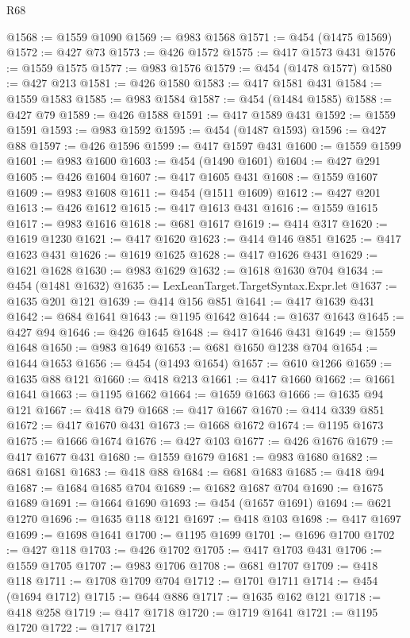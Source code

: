 \begin{lexlean}{R68}
\begin{coremodule}
@1568 := @1559 @1090
@1569 := @983 @1568
@1571 := @454 (@1475 @1569)
@1572 := @427 @73
@1573 := @426 @1572
@1575 := @417 @1573 @431
@1576 := @1559 @1575
@1577 := @983 @1576
@1579 := @454 (@1478 @1577)
@1580 := @427 @213
@1581 := @426 @1580
@1583 := @417 @1581 @431
@1584 := @1559 @1583
@1585 := @983 @1584
@1587 := @454 (@1484 @1585)
@1588 := @427 @79
@1589 := @426 @1588
@1591 := @417 @1589 @431
@1592 := @1559 @1591
@1593 := @983 @1592
@1595 := @454 (@1487 @1593)
@1596 := @427 @88
@1597 := @426 @1596
@1599 := @417 @1597 @431
@1600 := @1559 @1599
@1601 := @983 @1600
@1603 := @454 (@1490 @1601)
@1604 := @427 @291
@1605 := @426 @1604
@1607 := @417 @1605 @431
@1608 := @1559 @1607
@1609 := @983 @1608
@1611 := @454 (@1511 @1609)
@1612 := @427 @201
@1613 := @426 @1612
@1615 := @417 @1613 @431
@1616 := @1559 @1615
@1617 := @983 @1616
@1618 := @681 @1617
@1619 := @414 @317
@1620 := @1619 @1230
@1621 := @417 @1620
@1623 := @414 @146 @851
@1625 := @417 @1623 @431
@1626 := @1619 @1625
@1628 := @417 @1626 @431
@1629 := @1621 @1628
@1630 := @983 @1629
@1632 := @1618 @1630 @704
@1634 := @454 (@1481 @1632)
@1635 := LexLeanTarget.TargetSyntax.Expr.let
@1637 := @1635 @201 @121
@1639 := @414 @156 @851
@1641 := @417 @1639 @431
@1642 := @684 @1641
@1643 := @1195 @1642
@1644 := @1637 @1643
@1645 := @427 @94
@1646 := @426 @1645
@1648 := @417 @1646 @431
@1649 := @1559 @1648
@1650 := @983 @1649
@1653 := @681 @1650 @1238 @704
@1654 := @1644 @1653
@1656 := @454 (@1493 @1654)
@1657 := @610 @1266
@1659 := @1635 @88 @121
@1660 := @418 @213
@1661 := @417 @1660
@1662 := @1661 @1641
@1663 := @1195 @1662
@1664 := @1659 @1663
@1666 := @1635 @94 @121
@1667 := @418 @79
@1668 := @417 @1667
@1670 := @414 @339 @851
@1672 := @417 @1670 @431
@1673 := @1668 @1672
@1674 := @1195 @1673
@1675 := @1666 @1674
@1676 := @427 @103
@1677 := @426 @1676
@1679 := @417 @1677 @431
@1680 := @1559 @1679
@1681 := @983 @1680
@1682 := @681 @1681
@1683 := @418 @88
@1684 := @681 @1683
@1685 := @418 @94
@1687 := @1684 @1685 @704
@1689 := @1682 @1687 @704
@1690 := @1675 @1689
@1691 := @1664 @1690
@1693 := @454 (@1657 @1691)
@1694 := @621 @1270
@1696 := @1635 @118 @121
@1697 := @418 @103
@1698 := @417 @1697
@1699 := @1698 @1641
@1700 := @1195 @1699
@1701 := @1696 @1700
@1702 := @427 @118
@1703 := @426 @1702
@1705 := @417 @1703 @431
@1706 := @1559 @1705
@1707 := @983 @1706
@1708 := @681 @1707
@1709 := @418 @118
@1711 := @1708 @1709 @704
@1712 := @1701 @1711
@1714 := @454 (@1694 @1712)
@1715 := @644 @886
@1717 := @1635 @162 @121
@1718 := @418 @258
@1719 := @417 @1718
@1720 := @1719 @1641
@1721 := @1195 @1720
@1722 := @1717 @1721

\end{coremodule}
\end{lexlean}

